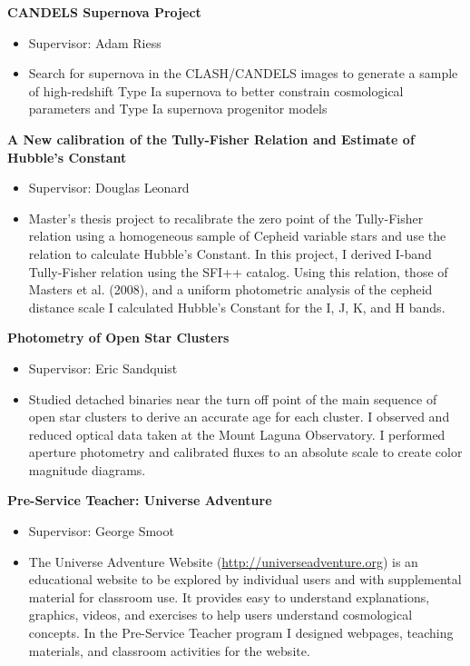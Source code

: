 \documentclass{res}
\begin{document}
\begin{resume}
	{\bf CANDELS Supernova Project}
		\begin{itemize}
		\item[] Supervisor: Adam Riess
		\item[] Search for supernova in the CLASH/CANDELS images to generate a sample of high-redshift Type Ia supernova to better constrain cosmological parameters and Type Ia supernova progenitor models
		\end{itemize}

   {\bf  A New calibration of the Tully-Fisher Relation and Estimate of Hubble's Constant} 
           \begin{itemize}
   	\item[] Supervisor: Douglas Leonard
        \item[] Master's thesis project to recalibrate the zero point of the Tully-Fisher relation using a homogeneous
        sample of Cepheid variable stars and use the relation to calculate Hubble's Constant. In this project, I derived I-band Tully-Fisher relation using the SFI++ catalog. Using this relation, those of Masters et al. (2008), and a uniform photometric analysis of the cepheid distance scale I calculated Hubble's Constant for the I, J, K, and H bands.
        \end{itemize} 
        
   {\bf Photometry of Open Star Clusters }
      		\begin{itemize}
   		\item[] Supervisor: Eric Sandquist
		\item[] Studied detached binaries near the turn off point of the main sequence of open star clusters to derive an accurate age for each cluster. I observed and reduced optical data taken at the Mount Laguna Observatory. I performed aperture photometry and calibrated fluxes to an absolute scale to create color magnitude diagrams.
   		\end{itemize}
   		
   {\bf Pre-Service Teacher: Universe Adventure}
   		\begin{itemize}
   		\item[] Supervisor: George Smoot
		\item[] The Universe Adventure Website ({\color{blue}\url{http://universeadventure.org}}) is an educational website to be explored by individual users and with supplemental material for classroom use. It provides easy to understand explanations, graphics, videos, and exercises to help users understand cosmological concepts. In the Pre-Service Teacher program I designed webpages, teaching materials, and classroom activities for the website.


\end{itemize}
\end{resume}
\end{document}
